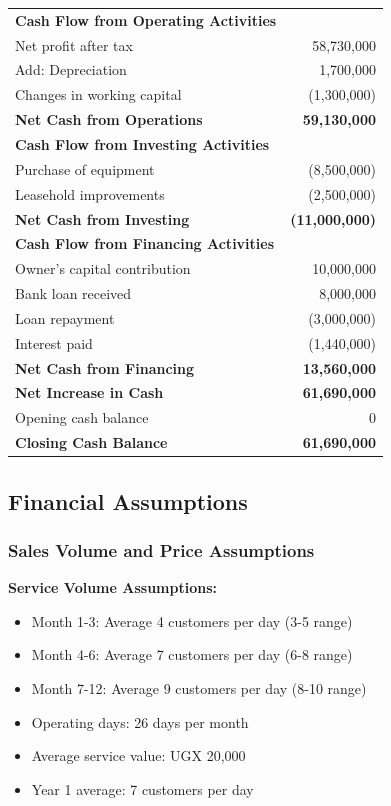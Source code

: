 \begin{tabular}{|l|r|}
\hline
\textbf{Cash Flow from Operating Activities} & \\
Net profit after tax & 58,730,000 \\
Add: Depreciation & 1,700,000 \\
Changes in working capital & (1,300,000) \\
\hline
\textbf{Net Cash from Operations} & \textbf{59,130,000} \\
\hline
\textbf{Cash Flow from Investing Activities} & \\
Purchase of equipment & (8,500,000) \\
Leasehold improvements & (2,500,000) \\
\hline
\textbf{Net Cash from Investing} & \textbf{(11,000,000)} \\
\hline
\textbf{Cash Flow from Financing Activities} & \\
Owner's capital contribution & 10,000,000 \\
Bank loan received & 8,000,000 \\
Loan repayment & (3,000,000) \\
Interest paid & (1,440,000) \\
\hline
\textbf{Net Cash from Financing} & \textbf{13,560,000} \\
\hline
\textbf{Net Increase in Cash} & \textbf{61,690,000} \\
Opening cash balance & 0 \\
\hline
\textbf{Closing Cash Balance} & \textbf{61,690,000} \\
\hline
\end{tabular}

\subsection{Financial Assumptions}

\subsubsection{Sales Volume and Price Assumptions}

\textbf{Service Volume Assumptions:}
\begin{itemize}[leftmargin=2em]
    \item Month 1-3: Average 4 customers per day (3-5 range)
    \item Month 4-6: Average 7 customers per day (6-8 range)
    \item Month 7-12: Average 9 customers per day (8-10 range)
    \item Operating days: 26 days per month
    \item Average service value: UGX 20,000
    \item Year 1 average: 7 customers per day
\end{itemize}

